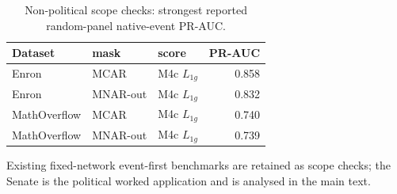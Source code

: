 \begin{table}[tbp]
\centering
\small
\caption{Non-political scope checks: strongest reported random-panel native-event PR-AUC.}
\label{tab:scope-checks}
\begin{tabular}{lllr}
\toprule
Dataset & mask & score & PR-AUC \\
\midrule
Enron & MCAR & M4c $L_{1g}$ & 0.858 \\
Enron & MNAR-out & M4c $L_{1g}$ & 0.832 \\
MathOverflow & MCAR & M4c $L_{1g}$ & 0.740 \\
MathOverflow & MNAR-out & M4c $L_{1g}$ & 0.739 \\
\bottomrule
\end{tabular}
\par\vspace{2pt}\footnotesize Existing fixed-network event-first benchmarks are retained as scope checks; the Senate is the political worked application and is analysed in the main text.
\end{table}
